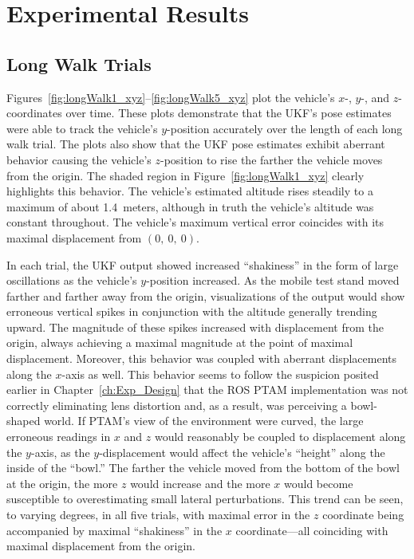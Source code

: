 \chapter{Experimental Results} \label{ch:Exp_Results}

\section{Long Walk Trials}

Figures~\ref{fig:longWalk1_xyz}--\ref{fig:longWalk5_xyz} plot the vehicle's $x$-, $y$-, and $z$-coordinates over time. These plots demonstrate that the UKF's pose estimates were able to track the vehicle's $y$-position accurately over the length of each long walk trial. The plots also show that the UKF pose estimates exhibit aberrant behavior causing the vehicle's $z$-position to rise the farther the vehicle moves from the origin. The shaded region in Figure~\ref{fig:longWalk1_xyz} clearly highlights this behavior. The vehicle's estimated altitude rises steadily to a maximum of about 1.4~meters, although in truth the vehicle's altitude was constant throughout. The vehicle's maximum vertical error coincides with its maximal displacement from $\left( 0,\ 0,\ 0 \right)$.

In each trial, the UKF output showed increased ``shakiness'' in the form of large oscillations as the vehicle's $y$-position increased. As the mobile test stand moved farther and farther away from the origin, visualizations of the output would show erroneous vertical spikes in conjunction with the altitude generally trending upward. The magnitude of these spikes increased with displacement from the origin, always achieving a maximal magnitude at the point of maximal displacement. Moreover, this behavior was coupled with aberrant displacements along the $x$-axis as well. This behavior seems to follow the suspicion posited earlier in Chapter~\ref{ch:Exp_Design} that the ROS PTAM implementation was not correctly eliminating lens distortion and, as a result, was perceiving a bowl-shaped world. If PTAM's view of the environment were curved, the large erroneous readings in $x$ and $z$ would reasonably be coupled to displacement along the $y$-axis, as the $y$-displacement would affect the vehicle's ``height'' along the inside of the ``bowl.'' The farther the vehicle moved from the bottom of the bowl at the origin, the more $z$ would increase and the more $x$ would become susceptible to overestimating small lateral perturbations. This trend can be seen, to varying degrees, in all five trials, with maximal error in the $z$ coordinate being accompanied by maximal ``shakiness'' in the $x$ coordinate---all coinciding with maximal displacement from the origin.

